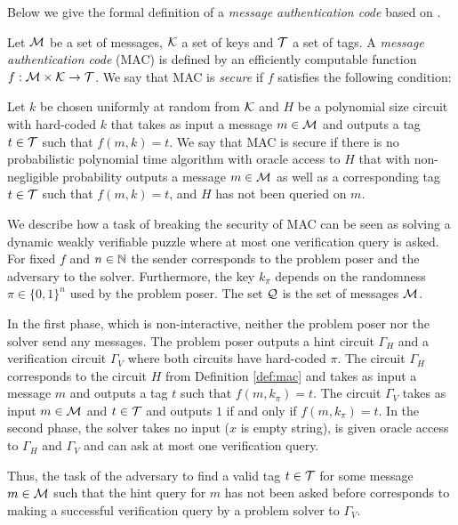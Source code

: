 Below we give the formal definition of a \textit{message authentication code} based on \cite{LectureNotesCrypo, Goldreich:2004:FCV:975541}.
%
\begin{definition}
  \label{def:mac}
  Let $\mathcal{M}$ be a set of messages, $\mathcal{K}$ a set of keys and $\mathcal{T}$ a set of tags.
  A \textit{message authentication code} (MAC) is defined by an efficiently computable function $f:\mathcal{M} \times \mathcal{K} \rightarrow \mathcal{T}$.
  We say that MAC is \textit{secure} if $f$ satisfies the following condition:

  Let $k$ be chosen uniformly at random from $\mathcal{K}$ and $H$ be a polynomial size circuit with hard-coded $k$
  that takes as input a message $m \in \mathcal{M}$ and outputs a tag $t \in \mathcal{T}$ such that $f(m,k) = t$.
  We say that MAC is secure if there is no probabilistic polynomial time algorithm
  with oracle access to $H$ that with non-negligible probability outputs a message $m \in \mathcal{M}$
  as well as a corresponding tag $t \in \mathcal{T}$ such that $f(m, k) = t$, and $H$ has not been queried on $m$.
\end{definition}

We describe how a task of breaking the security of MAC can be seen as solving a dynamic weakly verifiable puzzle
where at most one verification query is asked.
For fixed $f$ and $n \in \mathbb{N}$ the sender corresponds to the problem poser and the adversary to the solver.
Furthermore, the key $k_{\pi}$ depends on the randomness $\pi \in \{0,1\}^{n}$ used by the problem poser.
The set $\mathcal{Q}$ is the set of messages $\mathcal{M}$.

In the first phase, which is non-interactive, neither the problem poser nor the solver send any messages.
The problem poser outputs a hint circuit $\Gamma_H$ and a verification circuit $\Gamma_V$ where both circuits
have hard-coded $\pi$.
The circuit $\Gamma_H$ corresponds to the circuit $H$ from Definition \ref{def:mac} and takes as input
a message $m$ and outputs a tag $t$ such that $f(m, k_{\pi}) = t$.
The circuit $\Gamma_V$ takes as input $m \in \mathcal{M}$ and $t \in \mathcal{T}$ and outputs $1$ if and only if $f(m, k_{\pi}) = t$.
In the second phase, the solver takes no input ($x$ is empty string), is given oracle access to $\Gamma_H$ and $\Gamma_V$ and
can ask at most one verification query.

Thus, the task of the adversary to find a valid tag $t \in \mathcal{T}$ for some message $m \in \mathcal{M}$ such that the hint query for $m$
has not been asked before corresponds to making a successful verification query by a problem solver to $\Gamma_V$.
%
